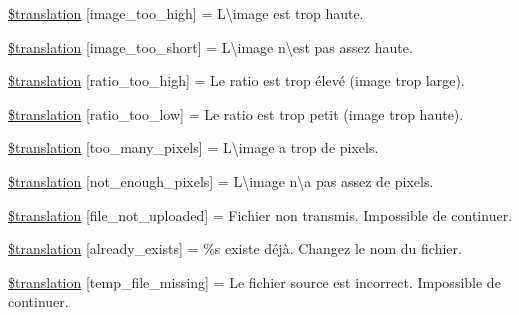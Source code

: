 \begin{DoxyCompactItemize}
\item 
\hyperlink{class_8upload_8fr___f_r_8php_aa27bde361343f3b63c7cd441860024f8}{\$translation} \mbox{[}\textquotesingle{}image\+\_\+too\+\_\+high\textquotesingle{}\mbox{]} = \textquotesingle{}L\textbackslash{}image est trop haute.\textquotesingle{}
\item 
\hyperlink{class_8upload_8fr___f_r_8php_a86fcd4e1157b00032df451188d735527}{\$translation} \mbox{[}\textquotesingle{}image\+\_\+too\+\_\+short\textquotesingle{}\mbox{]} = \textquotesingle{}L\textbackslash{}image n\textbackslash{}est pas assez haute.\textquotesingle{}
\item 
\hyperlink{class_8upload_8fr___f_r_8php_a23396f6ce7f31e5e5f1b57580621d982}{\$translation} \mbox{[}\textquotesingle{}ratio\+\_\+too\+\_\+high\textquotesingle{}\mbox{]} = \textquotesingle{}Le ratio est trop élevé (image trop large).\textquotesingle{}
\item 
\hyperlink{class_8upload_8fr___f_r_8php_ac533b9a479f056b0b8623e4268f068c2}{\$translation} \mbox{[}\textquotesingle{}ratio\+\_\+too\+\_\+low\textquotesingle{}\mbox{]} = \textquotesingle{}Le ratio est trop petit (image trop haute).\textquotesingle{}
\item 
\hyperlink{class_8upload_8fr___f_r_8php_aa4051ef64e94a3f8295c63cf85544016}{\$translation} \mbox{[}\textquotesingle{}too\+\_\+many\+\_\+pixels\textquotesingle{}\mbox{]} = \textquotesingle{}L\textbackslash{}\textquotesingle{}image a trop de pixels.\textquotesingle{}
\item 
\hyperlink{class_8upload_8fr___f_r_8php_a1fe342c27ce61f4ff4e0120ba647033e}{\$translation} \mbox{[}\textquotesingle{}not\+\_\+enough\+\_\+pixels\textquotesingle{}\mbox{]} = \textquotesingle{}L\textbackslash{}\textquotesingle{}image n\textbackslash{}\textquotesingle{}a pas assez de pixels.\textquotesingle{}
\item 
\hyperlink{class_8upload_8fr___f_r_8php_a4ce76e7be0b3a03c2b47f6d70c21832e}{\$translation} \mbox{[}\textquotesingle{}file\+\_\+not\+\_\+uploaded\textquotesingle{}\mbox{]} = \textquotesingle{}Fichier non transmis. Impossible de continuer.\textquotesingle{}
\item 
\hyperlink{class_8upload_8fr___f_r_8php_afd84e910217f04139f567c41e292afa5}{\$translation} \mbox{[}\textquotesingle{}already\+\_\+exists\textquotesingle{}\mbox{]} = \textquotesingle{}\%s existe déjà. Changez le nom du fichier.\textquotesingle{}
\item 
\hyperlink{class_8upload_8fr___f_r_8php_ab0fa87a88aba2624004581eed0633325}{\$translation} \mbox{[}\textquotesingle{}temp\+\_\+file\+\_\+missing\textquotesingle{}\mbox{]} = \textquotesingle{}Le fichier source est incorrect. Impossible de continuer.\textquotesingle{}

\end{DoxyCompactItemize}

